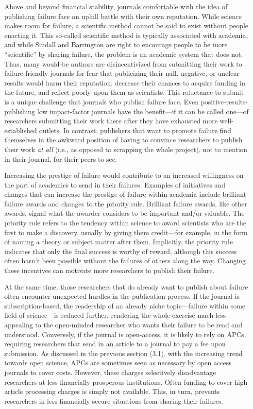 \documentclass{article}
\begin{document}
Above and beyond financial stability, journals comfortable with the idea of publishing failure face an uphill battle with their own reputation. While science makes room for failure, a scientific method cannot be said to exist without people enacting it. This so-called scientific method is typically associated with academia, and while Sindall and Barrington are right to encourage people to be more “scientific” by sharing failure, the problem is an academic system that does not. Thus, many would-be authors are disincentivized from submitting their work to failure-friendly journals for fear that publicizing their null, negative, or unclear results would harm their reputation, decrease their chances to acquire funding in the future, and reflect poorly upon them as scientists. This reluctance to submit is a unique challenge that journals who publish failure face. Even positive-results-publishing low impact-factor journals have the benefit—if it can be called one—of researchers submitting their work there after they have exhausted more well-established outlets. In contrast, publishers that want to promote failure find themselves in the awkward position of having to convince researchers to publish their work \emph{at all} (i.e., as opposed to scrapping the whole project), not to mention in their journal, for their peers to see. 

Increasing the prestige of failure would contribute to an increased willingness on the part of academics to send in their failures. Examples of initiatives and changes that can increase the prestige of failure within academia include brilliant failure awards and changes to the priority rule. Brilliant failure awards, like other awards, signal what the awarder considers to be important and/or valuable. The priority rule refers to the tendency within science to award scientists who are the first to make a discovery, usually by giving them credit—for example, in the form of naming a theory or subject matter after them. Implicitly, the priority rule indicates that only the final success is worthy of reward, although this success often hasn't been possible without the failures of others along the way. Changing these incentives can motivate more researchers to publish their failure. 

At the same time, those researchers that do already want to publish about failure often encounter unexpected hurdles in the publication process. If the journal is subscription-based, the readership of an already niche topic—failure within some field of science—is reduced further, rendering the whole exercise much less appealing to the open-minded researcher who wants their failure to be read and understood. Conversely, if the journal is open-access, it is likely to rely on APCs, requiring researchers that send in an article to a journal to pay a fee upon submission. As discussed in the previous section (3.1), with the increasing trend towards open science, APCs are sometimes seen as necessary by open access journals to cover costs. However, these charges selectively disadvantage researchers at less financially prosperous institutions. Often funding to cover high article processing charges is simply not available. This, in turn, prevents researchers in less financially secure situations from sharing their failures.
\end{document}
